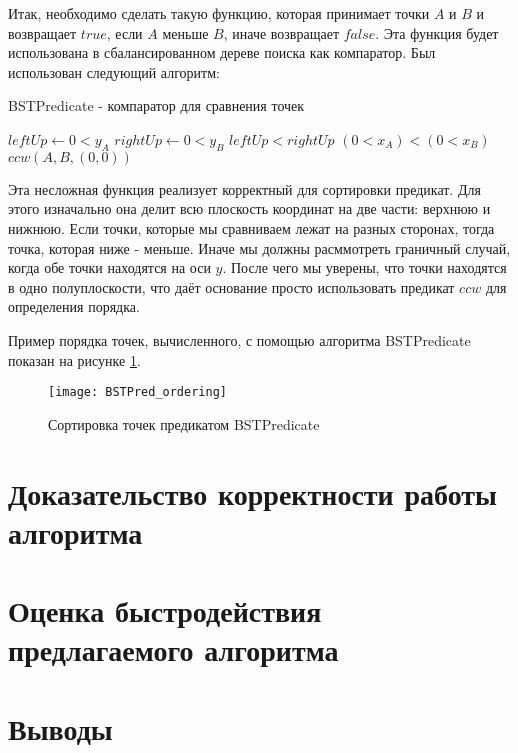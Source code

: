 Итак, необходимо сделать такую функцию, которая принимает точки $A$ и $B$ и возвращает $true$, если $A$ меньше $B$, иначе возвращает $false$. Эта функция будет использована в сбалансированном дереве поиска как компаратор. Был использован следующий алгоритм:

\begin{algorithm}[H]
	\caption{BSTPredicate - компаратор для сравнения точек}
	\label{alg:bst_predicate}
	\begin{algorithmic}[1]
		\State $leftUp \gets 0<y_A$
		\State $rightUp \gets 0<y_B$
			\Return $leftUp < rightUp$
		\EndIf
			\Return $(0<x_A) < (0<x_B)$
		\EndIf
		\Return $ccw(A, B, (0, 0))$
		\EndProcedure
	\end{algorithmic}
\end{algorithm}

Эта несложная функция реализует корректный для сортировки предикат. Для этого изначально она делит всю плоскость координат на две части: верхнюю и нижнюю. Если точки, которые мы сравниваем лежат на разных сторонах, тогда точка, которая ниже - меньше. Иначе мы должны расммотреть граничный случай, когда обе точки находятся на оси $y$. После чего мы уверены, что точки находятся в одно полуплоскости, что даёт основание просто использовать предикат $ccw$ для определения порядка.

Пример порядка точек, вычисленного, с помощью алгоритма BSTPredicate показан на рисунке \ref{img:BSTPred_ordering}.

\begin{figure}[H]
	\centering
	\texttt{[image: BSTPred\_ordering]}
	\caption{Сортировка точек предикатом BSTPredicate}
	\label{img:BSTPred_ordering}
\end{figure}

\section{Доказательство корректности работы алгоритма} \label{subsect2_3}

\section{Оценка быстродействия предлагаемого алгоритма} \label{subsect2_4}

\section{Выводы} \label{subsect2_5}